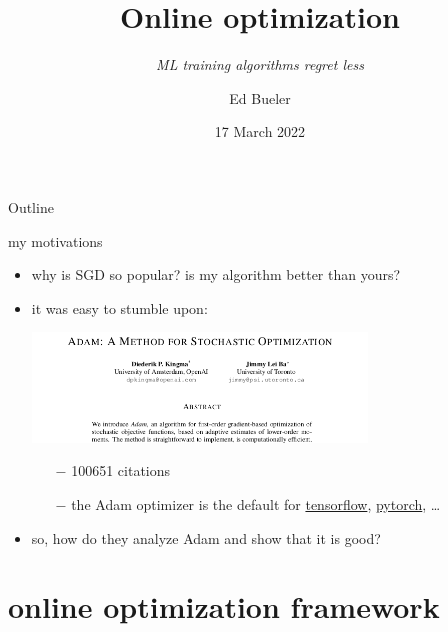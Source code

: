 \documentclass[xcolor={svgnames},
               hyperref={colorlinks,citecolor=DeepPink4,linkcolor=FireBrick,urlcolor=Maroon}]
               {beamer}
\title{Online optimization}
\subtitle{\emph{ML training algorithms regret less}}
\author{Ed Bueler}
\institute[UAF]{MATH 692 Mathematics for Machine Learning}
\date[]{17 March 2022}
\begin{document}
\beamertemplatenavigationsymbolsempty

\begin{frame}
  \maketitle
\end{frame}


\begin{frame}{Outline}
  \tableofcontents[hideallsubsections]
\end{frame}


\begin{frame}{my motivations}

\begin{itemize}
\item why is SGD so popular? is my algorithm better than yours?

\medskip
\item it was easy to stumble upon:

\medskip
\begin{center}
\includegraphics[width=0.7\textwidth]{figs/adam-paper.png}
\end{center}

\medskip
    \begin{itemize}
    \item[$-$] 100651 citations
    \item[$-$] the Adam optimizer is the default for \href{https://www.tensorflow.org/tutorials/keras/classification}{tensorflow}, \href{https://pytorch.org/docs/stable/optim.html}{pytorch}, \dots
    \end{itemize}

\medskip
\item so, how do they analyze Adam and show that it is good?
\end{itemize}
\end{frame}


\section{online optimization framework}
\end{document}
